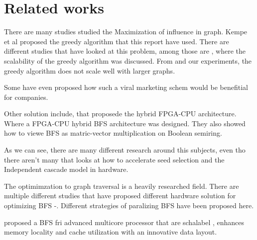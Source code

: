 \chapter{Related works}
There are many studies studied the Maximization of influence in graph\cite{MaximizeSpread2003}.  Kempe et al proposed the greedy algorithm that this report have used. There are different studies that have looked at this problem, among those are \cite{InfluenceMax}, where the scalability of the greedy algorithm was discussed. From \cite{InfluenceMax} and our experiments, the greedy algorithm does not scale well with larger graphs. 

Some have even proposed how such a viral marketing schem would be benefitial for companies.

Other solution include\cite{HybridBFS2015}, that proposede the hybrid FPGA-CPU architecture. Where a FPGA-CPU hybrid BFS architecture was designed. They also showed how to viewe BFS as matric-vector multiplication on Boolean semiring. 

As we can see, there are many different research around this subjects, even tho there aren't many that looks at how to accelerate seed selection and the Independent cascade model in hardware.


The optimimzation to graph traversal is a heavily researched field. There are multiple different studies that have proposed different hardware solution for optimizing BFS \cite{ScalabelGraphEx}-\cite{DirectOptimizeBFS}. Different strategies of paralizing BFS have been proposed here\cite{ParallelBFS2011}. 

\cite{ScalableGraphex} proposed a BFS fri advanced multicore processor that are schalabel , enhances memory locality and cache utilization with an innovative data layout.

\cite{}